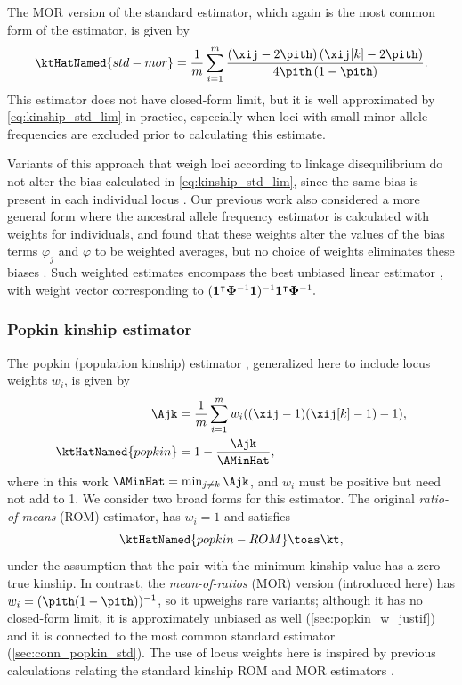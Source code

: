 \documentclass[11pt]{article}
\newcommand{\kinMat}{%
  \ensuremath{%
    \mathbf{\Phi}
  }%
  \xspace%
}%
\begin{document}
The MOR version of the standard estimator, which again is the most common form of the estimator, is given by
\begin{equation}
  \label{eq:kinship_std_mor}
  \ktHatNamed{std-mor}
  =
  \frac{1}{m} \sum\limits_{i=1}^m \frac{\left( \xij - 2 \pith \right) \left( \xij[k] - 2 \pith \right)}{4 \pith \left( 1-\pith \right)}
  .
\end{equation}
This estimator does not have closed-form limit, but it is well approximated by \cref{eq:kinship_std_lim} in practice, especially when loci with small minor allele frequencies are excluded prior to calculating this estimate.

Variants of this approach that weigh loci according to linkage disequilibrium \citep{speed_reevaluation_2017, wang_efficient_2017} do not alter the bias calculated in \cref{eq:kinship_std_lim}, since the same bias is present in each individual locus \citep{ochoa_estimating_2021}.
Our previous work also considered a more general form where the ancestral allele frequency estimator \pith is calculated with weights for individuals, and found that these weights alter the values of the bias terms $\bar{\varphi}_j$ and $\bar{\varphi}$ to be weighted averages, but no choice of weights eliminates these biases \citep{ochoa_estimating_2021}.
Such weighted \pith estimates encompass the best unbiased linear estimator \citep{astle_population_2009, thornton_roadtrips:_2010}, with weight vector corresponding to
$
( \mathbf{1}^\intercal \kinMat^{-1} \mathbf{1} )^{-1} \mathbf{1}^\intercal \kinMat^{-1}.
$

\subsubsection{Popkin kinship estimator}

The popkin (population kinship) estimator \citep{ochoa_estimating_2021}, generalized here to include locus weights $w_i$, is given by
\begin{equation}
  \label{eq:popkin}
  \begin{split}
    \Ajk
    &=
      \frac{1}{m} \sum_{i=1}^m w_i ( (\xij-1)(\xij[k]-1) - 1 )
      , \\
    \ktHatNamed{popkin}
    &=
      1 - \frac{\Ajk}{\AMinHat}
      ,
  \end{split}
\end{equation}
where in this work $\AMinHat = \min_{j \ne k} \Ajk$, and $w_i$ must be positive but need not add to 1.
We consider two broad forms for this estimator.
The original \textit{ratio-of-means} (ROM) estimator, has $w_i = 1$ and satisfies
$$
\ktHatNamed{popkin-ROM} \toas \kt,
$$
under the assumption that the pair with the minimum kinship value has a zero true kinship.
In contrast, the \textit{mean-of-ratios} (MOR) version (introduced here) has $w_i = (\pith (1-\pith))^{-1}$, so it upweighs rare variants; although it has no closed-form limit, it is approximately unbiased as well (\cref{sec:popkin_w_justif}) and it is connected to the most common standard estimator (\cref{sec:conn_popkin_std}). 
The use of locus weights here is inspired by previous calculations relating the standard kinship ROM and MOR estimators \citep{wang_efficient_2017}.
\end{document}
